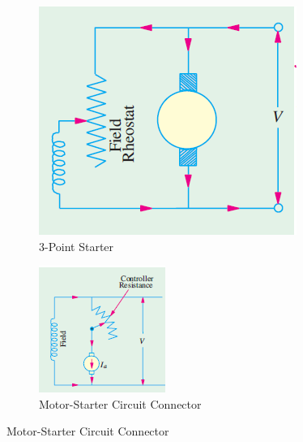 \documentclass[a4paper,12pt]{article}
\begin{document}
	\begin{figure}[H]
		\centering
		\begin{subfigure}[t]{.48\textwidth}
			\centering
			\includegraphics[width=.7\linewidth]{Images/1}
			\caption{ 3-Point Starter }
			\vspace{0.1cm}
		\end{subfigure}
		\hfill
		\begin{subfigure}[t]{.48\textwidth}
			\centering
			\includegraphics[width=1\linewidth]{Images/2}
			\caption{Motor-Starter Circuit Connector}
		\end{subfigure}
	\end{figure}
	
\end{document}
